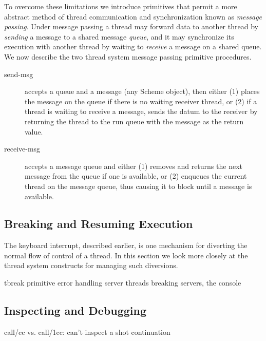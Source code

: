 \documentclass{article}
\begin{document}
To overcome these limitations we introduce primitives that permit
a more abstract method of thread communication and synchronization
known as {\em message passing}.  Under message passing a thread may
forward data to another thread by {\em sending\/} a message to a
shared message {\em queue}, and it may synchronize its execution with
another thread by waiting to {\em receive\/} a message on a shared
queue.  We now describe the two thread system message passing
primitive procedures.

\begin{description}

\item[\sf send-msg] accepts a queue and a message (any Scheme object),
then either (1) places the message on the queue if there is no waiting
receiver thread, or (2) if a thread is waiting to receive a message,
sends the datum to the receiver by returning the thread to the run
queue with the message as the return value.

\item[\sf receive-msg] accepts a message queue and either (1) removes and
returns the next message from the queue if one is available, or (2)
enqueues the current thread on the message queue, thus causing it to
block until a message is available.

\end{description}



\subsection{Breaking and Resuming Execution}


The keyboard interrupt, described earlier, is one mechanism for
diverting the normal flow of control of a thread.  In this section we
look more closely at the thread system constructs for managing such
diversions.

	tbreak primitive
	error handling
	server threads
	breaking servers, the console


\subsection{Inspecting and Debugging}
	{\sf call/cc} vs. {\sf call/1cc}: can't inspect a shot continuation


\end{document}
